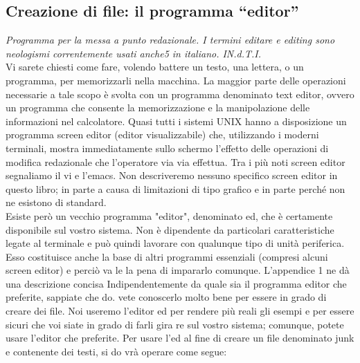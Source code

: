 \subsection{Creazione di file: il programma ``editor''}
{\it Programma per la messa a punto redazionale. I termini editare e editing sono neologismi correntemente usati anche5 in italiano. IN.d.T.I.}\\
Vi sarete chiesti come fare, volendo battere un testo, una lettera, o un programma,
per memorizzarli nella macchina. La maggior parte delle operazioni necessarie a tale
scopo è svolta con un programma denominato text editor, ovvero un programma che
consente la memorizzazione e la manipolazione delle informazioni nel calcolatore.
Quasi tutti i sistemi UNIX hanno a disposizione un programma screen editor (editor
visualizzabile) che, utilizzando i moderni terminali, mostra immediatamente sullo
schermo l'effetto delle operazioni di modifica redazionale che l'operatore via via effettua.
Tra i più noti screen editor segnaliamo il vi e l'emacs. Non descriveremo nessuno
specifico screen editor in questo libro; in parte a causa di limitazioni di tipo grafico
e in parte perché non ne esistono di standard.\\
Esiste però un vecchio programma "editor", denominato ed, che è certamente disponibile 
sul vostro sistema. Non è dipendente da particolari caratteristiche legate al terminale
e può quindi lavorare con qualunque tipo di unità periferica. Esso costituisce
anche la base di altri programmi essenziali (compresi alcuni screen editor) e perciò va
le la pena di impararlo comunque. L'appendice 1 ne dà una descrizione concisa
Indipendentemente da quale sia il programma editor che preferite, sappiate che do.
vete conoscerlo molto bene per essere in grado di creare dei file. Noi useremo l'editor
ed per rendere più reali gli esempi e per essere sicuri che voi siate in grado di farli gira
re sul vostro sistema; comunque, potete usare l'editor che preferite.
Per usare l'ed al fine di creare un file denominato junk e contenente dei testi, si do
vrà operare come segue:\\
